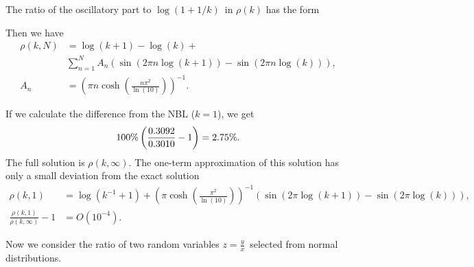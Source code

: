 \documentclass[titlepage,fleqn]{article}%
\begin{document}
The ratio of the oscillatory part to $\log(1+1/k)$\ in \bigskip$\rho(k)$ has
the form%

%


Then we have%
\begin{align}
\rho(k,N)  &  =\log(k+1)-\log(k)+\nonumber\\
&
{\displaystyle\sum\limits_{n=1}^{N}}
A_{n}\left(  \sin(2\pi n\log(k+1))-\sin(2\pi n\log(k))\right)  ,
\label{2NumbR}\\
A_{n}  &  =\left(  \pi n\cosh\left(  \frac{n\pi^{2}}{\ln(10)}\right)  \right)
^{-1}.\nonumber
\end{align}


If we calculate the difference from the NBL ($k=1$), we get%
\[
100\%\left(  \frac{0{\small .3092}}{0.3010}-1\right)  =2.75\%.
\]
The full solution is $\rho(k,\infty).$ The one-term approximation of this
solution has only a small deviation from the exact solution
\begin{align*}
\rho(k,1)  &  =\log(k^{-1}+1)+\left(  \pi\cosh\left(  \frac{\pi^{2}}{\ln
(10)}\right)  \right)  ^{-1}\left(  \sin(2\pi\log(k+1))-\sin(2\pi
\log(k))\right)  ,\\
\frac{\rho(k,1)}{\rho(k,\infty)}-1  &  =O\left(  10^{-4}\right)  .
\end{align*}


Now we consider the ratio of two random variables $z=\frac{y}{x}$\ selected
from normal distributions.
\end{document}
